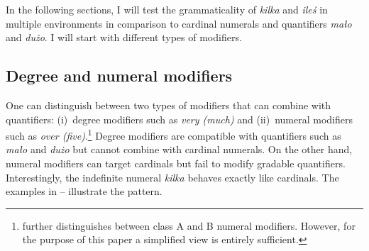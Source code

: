 \documentclass[output=paper,
]{langscibook}
\begin{document}
	\noindent In the following sections, I will test the grammaticality of \textit{kilka} and \textit{ileś} in multiple environments in comparison to cardinal numerals and quantifiers \textit{mało} and \textit{dużo}. I will start with different types of modifiers.
	
	\subsection{Degree and numeral modifiers}\label{sec:degree-and-numeral-modifiers}
	
	One can distinguish between two types of modifiers that can combine with quantifiers: (i)~degree modifiers such as \textit{very (much)} and (ii)~numeral modifiers such as \textit{over (five)}.\footnote{\cite{nouwen2010two} further distinguishes between class A and B numeral modifiers. However, for the purpose of this paper a simplified view is entirely sufficient.} Degree modifiers are compatible with quantifiers such as \textit{mało} and \textit{dużo} but cannot combine with cardinal numerals. On the other hand, numeral modifiers can target cardinals but fail to modify gradable quantifiers. Interestingly, the indefinite numeral \textit{kilka} behaves exactly like cardinals. The examples in -- illustrate the pattern. 
	\vspace{2cm}
\end{document}
